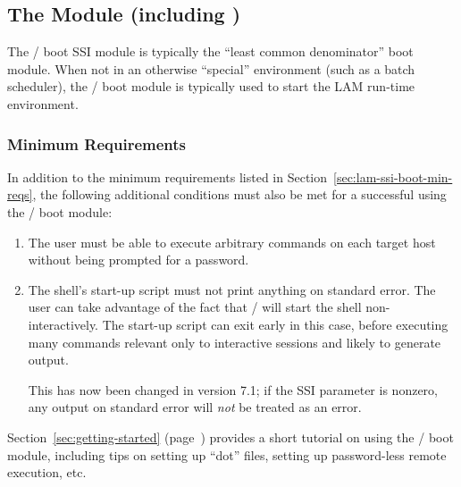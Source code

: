
\subsection{The  Module (including )}

The / boot SSI module is typically the ``least
common denominator'' boot module.  When not in an otherwise
``special'' environment (such as a batch scheduler), the
/ boot module is typically used to start the LAM
run-time environment.


\subsubsection{Minimum Requirements}

In addition to the minimum requirements listed in
Section~\ref{sec:lam-ssi-boot-min-reqs}, the following additional
conditions must also be met for a successful  using the
 /  boot module:

\begin{enumerate}
\item The user must be able to execute arbitrary commands on each
  target host without being prompted for a password.
  
\item The shell's start-up script must not print anything on standard
  error. The user can take advantage of the fact that  /
   will start the shell non-interactively. The start-up
  script can exit early in this case, before executing many commands
  relevant only to interactive sessions and likely to generate output.

  This has now been changed in version 7.1; if the SSI parameter
   is nonzero, any output
  on standard error will {\em not} be treated as an error.
\end{enumerate}

Section~\ref{sec:getting-started} (page~\pageref{sec:getting-started})
provides a short tutorial on using the  /  boot
module, including tips on setting up ``dot'' files, setting up
password-less remote execution, etc.

